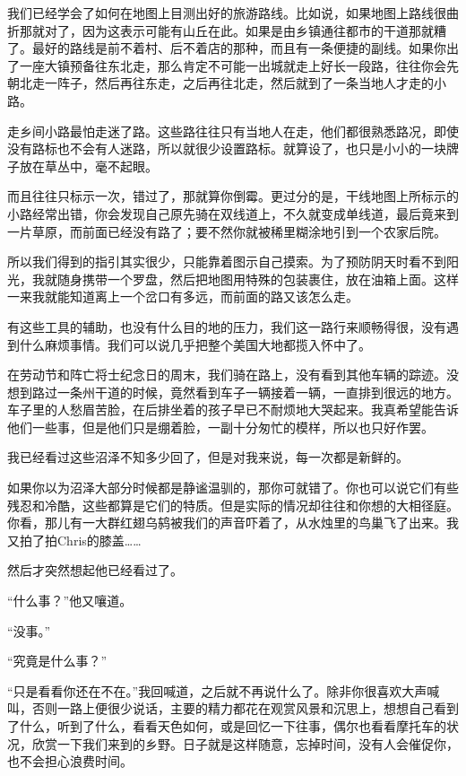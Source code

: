 \documentclass[UTF8]{article}
\begin{document}
\par 我们已经学会了如何在地图上目测出好的旅游路线。比如说，如果地图上路线很曲折那就对了，因为这表示可能有山丘在此。如果是由乡镇通往都市的干道那就糟了。最好的路线是前不着村、后不着店的那种，而且有一条便捷的副线。如果你出了一座大镇预备往东北走，那么肯定不可能一出城就走上好长一段路，往往你会先朝北走一阵子，然后再往东走，之后再往北走，然后就到了一条当地人才走的小路。
\par 走乡间小路最怕走迷了路。这些路往往只有当地人在走，他们都很熟悉路况，即使没有路标也不会有人迷路，所以就很少设置路标。就算设了，也只是小小的一块牌子放在草丛中，毫不起眼。
\par 而且往往只标示一次，错过了，那就算你倒霉。更过分的是，干线地图上所标示的小路经常出错，你会发现自己原先骑在双线道上，不久就变成单线道，最后竟来到一片草原，而前面已经没有路了；要不然你就被稀里糊涂地引到一个农家后院。
\par 所以我们得到的指引其实很少，只能靠着图示自己摸索。为了预防阴天时看不到阳光，我就随身携带一个罗盘，然后把地图用特殊的包装裹住，放在油箱上面。这样一来我就能知道离上一个岔口有多远，而前面的路又该怎么走。
\par 有这些工具的辅助，也没有什么目的地的压力，我们这一路行来顺畅得很，没有遇到什么麻烦事情。我们可以说几乎把整个美国大地都揽入怀中了。
\par 在劳动节和阵亡将士纪念日的周末，我们骑在路上，没有看到其他车辆的踪迹。没想到路过一条州干道的时候，竟然看到车子一辆接着一辆，一直排到很远的地方。车子里的人愁眉苦脸，在后排坐着的孩子早已不耐烦地大哭起来。我真希望能告诉他们一些事，但是他们只是绷着脸，一副十分匆忙的模样，所以也只好作罢。
\par 我已经看过这些沼泽不知多少回了，但是对我来说，每一次都是新鲜的。
\par 如果你以为沼泽大部分时候都是静谧温驯的，那你可就错了。你也可以说它们有些残忍和冷酷，这些都算是它们的特质。但是实际的情况却往往和你想的大相径庭。你看，那儿有一大群红翅乌鸫被我们的声音吓着了，从水烛里的鸟巢飞了出来。我又拍了拍Chris的膝盖……
\par 然后才突然想起他已经看过了。
\par “什么事？”他又嚷道。
\par “没事。”
\par “究竟是什么事？”
\par “只是看看你还在不在。”我回喊道，之后就不再说什么了。除非你很喜欢大声喊叫，否则一路上便很少说话，主要的精力都花在观赏风景和沉思上，想想自己看到了什么，听到了什么，看看天色如何，或是回忆一下往事，偶尔也看看摩托车的状况，欣赏一下我们来到的乡野。日子就是这样随意，忘掉时间，没有人会催促你，也不会担心浪费时间。
\end{document}
